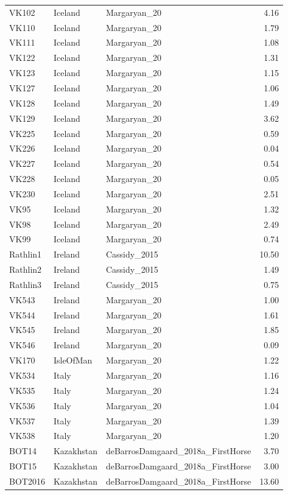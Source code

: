 \begin{longtable}[t]{lllr}
VK102 & Iceland & Margaryan\_20 & 4.16\\
VK110 & Iceland & Margaryan\_20 & 1.79\\
VK111 & Iceland & Margaryan\_20 & 1.08\\
VK122 & Iceland & Margaryan\_20 & 1.31\\
VK123 & Iceland & Margaryan\_20 & 1.15\\
VK127 & Iceland & Margaryan\_20 & 1.06\\
VK128 & Iceland & Margaryan\_20 & 1.49\\
VK129 & Iceland & Margaryan\_20 & 3.62\\
VK225 & Iceland & Margaryan\_20 & 0.59\\
VK226 & Iceland & Margaryan\_20 & 0.04\\
VK227 & Iceland & Margaryan\_20 & 0.54\\
VK228 & Iceland & Margaryan\_20 & 0.05\\
VK230 & Iceland & Margaryan\_20 & 2.51\\
VK95 & Iceland & Margaryan\_20 & 1.32\\
VK98 & Iceland & Margaryan\_20 & 2.49\\
VK99 & Iceland & Margaryan\_20 & 0.74\\
Rathlin1 & Ireland & Cassidy\_2015 & 10.50\\
Rathlin2 & Ireland & Cassidy\_2015 & 1.49\\
Rathlin3 & Ireland & Cassidy\_2015 & 0.75\\
VK543 & Ireland & Margaryan\_20 & 1.00\\
VK544 & Ireland & Margaryan\_20 & 1.61\\
VK545 & Ireland & Margaryan\_20 & 1.85\\
VK546 & Ireland & Margaryan\_20 & 0.09\\
VK170 & IsleOfMan & Margaryan\_20 & 1.22\\
VK534 & Italy & Margaryan\_20 & 1.16\\
VK535 & Italy & Margaryan\_20 & 1.24\\
VK536 & Italy & Margaryan\_20 & 1.04\\
VK537 & Italy & Margaryan\_20 & 1.39\\
VK538 & Italy & Margaryan\_20 & 1.20\\
BOT14 & Kazakhstan & deBarrosDamgaard\_2018a\_FirstHorse & 3.70\\
BOT15 & Kazakhstan & deBarrosDamgaard\_2018a\_FirstHorse & 3.00\\
BOT2016 & Kazakhstan & deBarrosDamgaard\_2018a\_FirstHorse & 13.60\\

\end{longtable}
